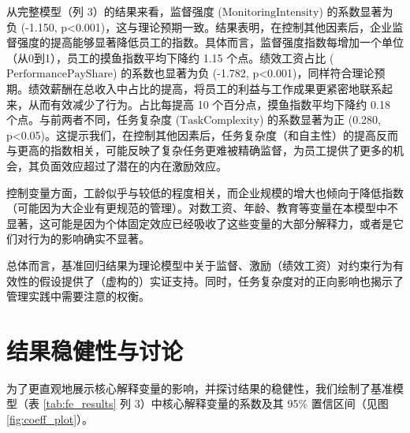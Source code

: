 从完整模型（列 3）的结果来看，{监督强度 (\(\text{MonitoringIntensity}\))} 的系数显著为负 (-1.150, p<0.001)，这与理论预期一致。结果表明，在控制其他因素后，企业监督强度的提高能够显著降低员工的指数。具体而言，监督强度指数每增加一个单位（从0到1），员工的摸鱼指数平均下降约 1.15 个点。{绩效工资占比 (\(\text{PerformancePayShare}\))} 的系数也显著为负 (-1.782, p<0.001)，同样符合理论预期。绩效薪酬在总收入中占比的提高，将员工的利益与工作成果更紧密地联系起来，从而有效减少了行为。占比每提高 10 个百分点，摸鱼指数平均下降约 0.18 个点。与前两者不同，{任务复杂度 (\(\text{TaskComplexity}\))} 的系数显著为正 (0.280, p<0.05)。这提示我们，在控制其他因素后，任务复杂度（和自主性）的提高反而与更高的指数相关，可能反映了复杂任务更难被精确监督，为员工提供了更多的机会，其负面效应超过了潜在的内在激励效应。

控制变量方面，工龄似乎与较低的程度相关，而企业规模的增大也倾向于降低指数（可能因为大企业有更规范的管理）。对数工资、年龄、教育等变量在本模型中不显著，这可能是因为个体固定效应已经吸收了这些变量的大部分解释力，或者是它们对行为的影响确实不显著。

总体而言，基准回归结果为理论模型中关于监督、激励（绩效工资）对约束行为有效性的假设提供了（虚构的）实证支持。同时，任务复杂度对的正向影响也揭示了管理实践中需要注意的权衡。

\section{结果稳健性与讨论}\label{sec:empirical_robustness}

为了更直观地展示核心解释变量的影响，并探讨结果的稳健性，我们绘制了基准模型（表 \ref{tab:fe_results} 列 3）中核心解释变量的系数及其 95\% 置信区间（见图 \ref{fig:coeff_plot}）。

